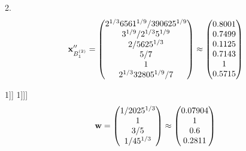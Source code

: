 \documentclass[10pt,a4paper]{article}
\begin{document}
	2.
	\[
		\bold{x}''_{B_1^{(2)}} = 
		\begin{pmatrix}
			{{2^ {1 / 3}}{6561^ {1 / 9}}} / {{390625^ {1 / 9}}} \\
			{{3^ {1 / 9}}} / {{2^ {1 / 3}}{5^ {1 / 9}}} \\
			{{2}} / {{5625^ {1 / 3}}} \\
			{{5}} / {{7}} \\
			{1}{} \\
			{{2^ {1 / 3}}{32805^ {1 / 9}}} / {{7}} \\
		\end{pmatrix}
		\approx
		\begin{pmatrix}
			0.8001   \\
			0.7499   \\
			0.1125   \\
			0.7143   \\
			1        \\
			0.5715   \\
		\end{pmatrix}
	\]

1]]
	1]]]
	\[
		\bold{w} = 
		\begin{pmatrix}
			{1} / {{2025^ {1 / 3}}} \\
			{1}{} \\
			{{3}} / {{5}} \\
			{1} / {{45^ {1 / 3}}} \\
		\end{pmatrix}
		\approx
		\begin{pmatrix}
			0.07904  \\
			1        \\
			0.6      \\
			0.2811   \\
		\end{pmatrix}
	\]
\end{document}
